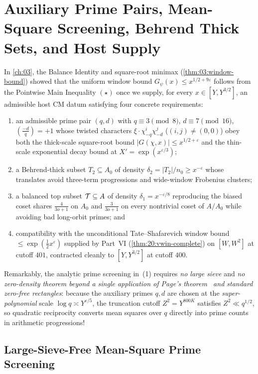 \chapter{Auxiliary Prime Pairs, Mean-Square Screening, Behrend Thick Sets, and Host Supply}
\label{ch:04}

In \cref{ch:03}, the Balance Identity and square-root minimax (\cref{thm:03:window-bound}) showed that the uniform window bound $G_\psi(x) \le x^{1/2 + 9\varepsilon}$ follows from the Pointwise Main Inequality $(\star)$ once we supply, for every $x \in [Y, Y^{3/2}]$, an admissible host CM datum satisfying four concrete requirements:
\begin{enumerate}[label=(\arabic*)]
\item an admissible prime pair $(q, d)$ with $q \equiv 3 \pmod 8$, $d \equiv 7 \pmod{16}$, $(\frac{-d}{q}) = +1$ whose twisted characters $\xi \cdot \chi_{-q}^i \chi_{-d}^j$ ($(i, j) \neq (0, 0)$) obey both the thick-scale square-root bound $|G(\chi, x)| \le x^{1/2 + \varepsilon}$ and the thin-scale exponential decay bound at $X' = \exp(x^{\varepsilon/3})$;
\item a Behrend-thick subset $T_2 \subseteq A_0$ of density $\delta_2 = |T_2|/n_0 \ge x^{-\varepsilon}$ whose translates avoid three-term progressions and wide-window Frobenius clusters;
\item a balanced top subset $\mathcal{T} \subseteq A$ of density $\delta_1 = x^{-\varepsilon/8}$ reproducing the biased coset shares $\frac{4}{3o+1}$ on $A_0$ and $\frac{3}{3o+1}$ on every nontrivial coset of $A/A_0$ while avoiding bad long-orbit primes; and
\item compatibility with the unconditional Tate--Shafarevich window bound $\le \exp(\frac{1}{2}x^\varepsilon)$ supplied by Part~VI (\cref{thm:20:vwin-complete}) on $[W, W^2]$ at cutoff $401$, contracted cleanly to $[Y, Y^{3/2}]$ at cutoff $400$.
\end{enumerate}

Remarkably, the analytic prime screening in~(1) requires \emph{no large sieve} and \emph{no zero-density theorem beyond a single application of Page's theorem~\cite{Page1935} and standard zero-free rectangles}: because the auxiliary primes $q, d$ are chosen at the \emph{super-polynomial} scale $\log q \asymp Y^{\varepsilon/5}$, the truncation cutoff $Z^2 = Y^{800K}$ satisfies $Z^2 \ll q^{1/2}$, so quadratic reciprocity converts mean squares over $q$ directly into prime counts in arithmetic progressions!

\section{Large-Sieve-Free Mean-Square Prime Screening}
\label{sec:04:mean-square}

